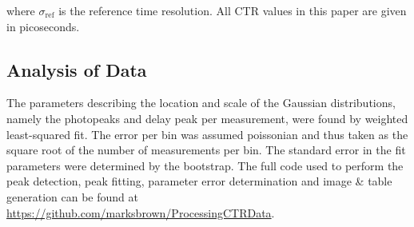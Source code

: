 where $\sigma_\text{ref}$ is the reference time resolution. All CTR values in this paper are given in picoseconds.

\subsection{Analysis of Data}
The parameters describing the location and scale of the Gaussian distributions, namely the photopeaks and delay peak per measurement, were found by weighted least-squared fit. The error per bin was assumed poissonian and thus taken as the square root of the number of measurements per bin. The standard error in the fit parameters were determined by the bootstrap\cite{degroot2012probability}. The full code used to perform the peak detection, peak fitting, parameter error determination and image \& table generation can be found at \href{https://github.com/marksbrown/ProcessingCTRData}{https://github.com/marksbrown/ProcessingCTRData}.
